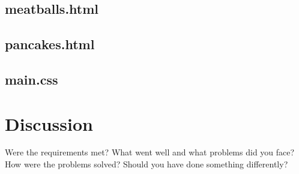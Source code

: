 \documentclass[a4paper]{scrartcl}
\begin{document}
\subsection{meatballs.html}


\subsection{pancakes.html}


\subsection{main.css}


\section{Discussion}

Were the requirements met? What went well and what problems did you face? How were the problems solved? Should you have done something differently?
\end{document}
